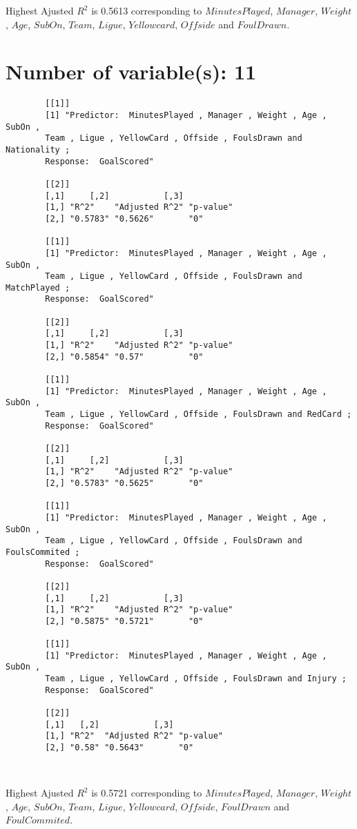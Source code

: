\documentclass[12pt]{article}
\begin{document}
	Highest Ajusted $ R^2 $ is 0.5613 corresponding to $ MinutesPlayed $, $ Manager $, $ Weight $, $ Age $, $ SubOn $, $ Team $, $ Ligue $, $ Yellowcard $, $ Offside $ and $ FoulDrawn $.
	
	\section{Number of variable(s): 11}
	
	\begin{verbatim}
		[[1]]
		[1] "Predictor:  MinutesPlayed , Manager , Weight , Age , SubOn , 
		Team , Ligue , YellowCard , Offside , FoulsDrawn and Nationality ; 
		Response:  GoalScored"
		
		[[2]]
		[,1]     [,2]           [,3]     
		[1,] "R^2"    "Adjusted R^2" "p-value"
		[2,] "0.5783" "0.5626"       "0"      
		
		[[1]]
		[1] "Predictor:  MinutesPlayed , Manager , Weight , Age , SubOn , 
		Team , Ligue , YellowCard , Offside , FoulsDrawn and MatchPlayed ; 
		Response:  GoalScored"
		
		[[2]]
		[,1]     [,2]           [,3]     
		[1,] "R^2"    "Adjusted R^2" "p-value"
		[2,] "0.5854" "0.57"         "0"      
		
		[[1]]
		[1] "Predictor:  MinutesPlayed , Manager , Weight , Age , SubOn , 
		Team , Ligue , YellowCard , Offside , FoulsDrawn and RedCard ; 
		Response:  GoalScored"
		
		[[2]]
		[,1]     [,2]           [,3]     
		[1,] "R^2"    "Adjusted R^2" "p-value"
		[2,] "0.5783" "0.5625"       "0"      
		
		[[1]]
		[1] "Predictor:  MinutesPlayed , Manager , Weight , Age , SubOn , 
		Team , Ligue , YellowCard , Offside , FoulsDrawn and FoulsCommited ; 
		Response:  GoalScored"
		
		[[2]]
		[,1]     [,2]           [,3]     
		[1,] "R^2"    "Adjusted R^2" "p-value"
		[2,] "0.5875" "0.5721"       "0"      
		
		[[1]]
		[1] "Predictor:  MinutesPlayed , Manager , Weight , Age , SubOn , 
		Team , Ligue , YellowCard , Offside , FoulsDrawn and Injury ; 
		Response:  GoalScored"
		
		[[2]]
		[,1]   [,2]           [,3]     
		[1,] "R^2"  "Adjusted R^2" "p-value"
		[2,] "0.58" "0.5643"       "0"      
		
		
	\end{verbatim}
	
	Highest Ajusted $ R^2 $ is 0.5721 corresponding to $ MinutesPlayed $, $ Manager $, $ Weight $, $ Age $, $ SubOn $, $ Team $, $ Ligue $, $ Yellowcard $, $ Offside $, $ FoulDrawn $ and $ FoulCommited $.
	
\end{document}
